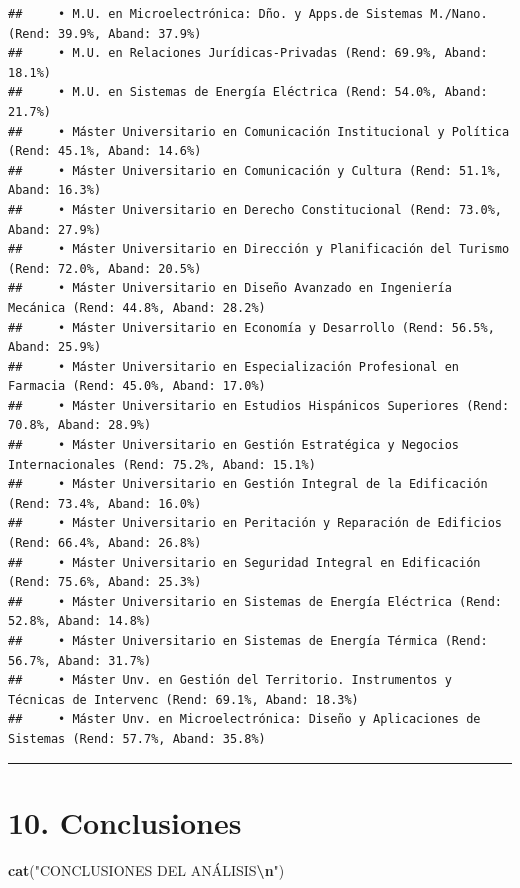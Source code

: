 \documentclass[
]{article}
\newenvironment{Shaded}{\begin{snugshade}}{\end{snugshade}}
\newcommand{\FunctionTok}[1]{\textcolor[rgb]{0.13,0.29,0.53}{\textbf{#1}}}
\newcommand{\NormalTok}[1]{#1}
\newcommand{\SpecialCharTok}[1]{\textcolor[rgb]{0.81,0.36,0.00}{\textbf{#1}}}
\newcommand{\StringTok}[1]{\textcolor[rgb]{0.31,0.60,0.02}{#1}}
\begin{document}
\begin{verbatim}
##     • M.U. en Microelectrónica: Dño. y Apps.de Sistemas M./Nano. (Rend: 39.9%, Aband: 37.9%)
##     • M.U. en Relaciones Jurídicas-Privadas (Rend: 69.9%, Aband: 18.1%)
##     • M.U. en Sistemas de Energía Eléctrica (Rend: 54.0%, Aband: 21.7%)
##     • Máster Universitario en Comunicación Institucional y Política (Rend: 45.1%, Aband: 14.6%)
##     • Máster Universitario en Comunicación y Cultura (Rend: 51.1%, Aband: 16.3%)
##     • Máster Universitario en Derecho Constitucional (Rend: 73.0%, Aband: 27.9%)
##     • Máster Universitario en Dirección y Planificación del Turismo (Rend: 72.0%, Aband: 20.5%)
##     • Máster Universitario en Diseño Avanzado en Ingeniería Mecánica (Rend: 44.8%, Aband: 28.2%)
##     • Máster Universitario en Economía y Desarrollo (Rend: 56.5%, Aband: 25.9%)
##     • Máster Universitario en Especialización Profesional en Farmacia (Rend: 45.0%, Aband: 17.0%)
##     • Máster Universitario en Estudios Hispánicos Superiores (Rend: 70.8%, Aband: 28.9%)
##     • Máster Universitario en Gestión Estratégica y Negocios Internacionales (Rend: 75.2%, Aband: 15.1%)
##     • Máster Universitario en Gestión Integral de la Edificación (Rend: 73.4%, Aband: 16.0%)
##     • Máster Universitario en Peritación y Reparación de Edificios (Rend: 66.4%, Aband: 26.8%)
##     • Máster Universitario en Seguridad Integral en Edificación (Rend: 75.6%, Aband: 25.3%)
##     • Máster Universitario en Sistemas de Energía Eléctrica (Rend: 52.8%, Aband: 14.8%)
##     • Máster Universitario en Sistemas de Energía Térmica (Rend: 56.7%, Aband: 31.7%)
##     • Máster Unv. en Gestión del Territorio. Instrumentos y Técnicas de Intervenc (Rend: 69.1%, Aband: 18.3%)
##     • Máster Unv. en Microelectrónica: Diseño y Aplicaciones de Sistemas (Rend: 57.7%, Aband: 35.8%)
\end{verbatim}

\begin{center}\rule{0.5\linewidth}{0.5pt}\end{center}

\section{10. Conclusiones}\label{conclusiones}

\begin{Shaded}
\begin{Highlighting}[]
\FunctionTok{cat}\NormalTok{(}\StringTok{"CONCLUSIONES DEL ANÁLISIS}\SpecialCharTok{\textbackslash{}n}\StringTok{"}\NormalTok{)}
\end{Highlighting}
\end{Shaded}
\end{document}
